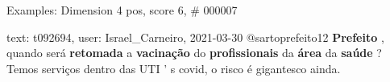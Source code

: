 \begin{frame}{Examples: Dimension 4 pos, score 6, \# 000007}
\footnotesize
\begin{exampleblock}{text: t092694, user: Israel\_Carneiro, 2021-03-30}
@sartoprefeito12 \textbf{Prefeito} , quando será \textbf{retomada} a 
\textbf{vacinação} do \textbf{profissionais} da \textbf{área} da \textbf{saúde} 
? Temos serviços dentro das UTI ' s covid, o risco é gigantesco ainda. 
\end{exampleblock}
\end{frame}
